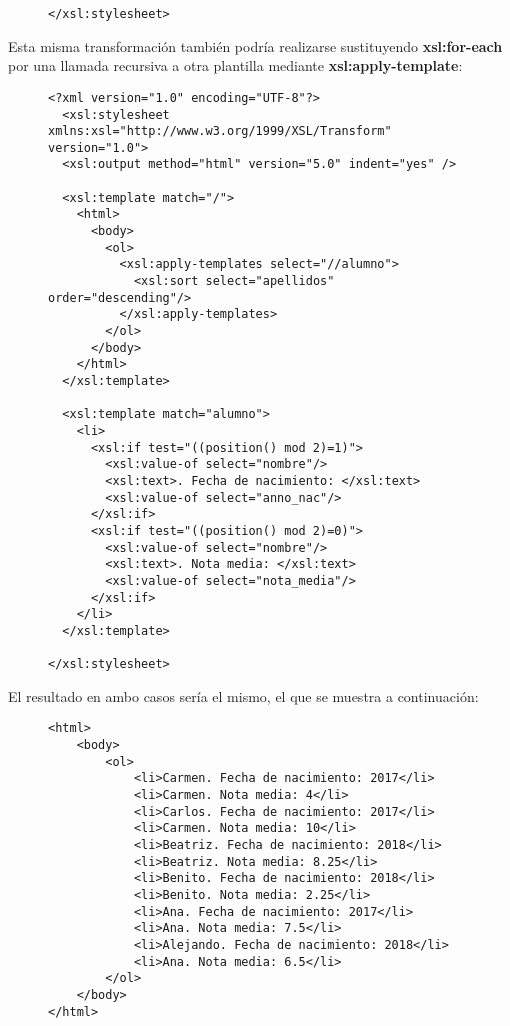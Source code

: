 \begin{itemize}
\begin{figure}[H]
\begin{tcolorbox}[sharp corners, colback=yellow!30, colframe=white!20]
\begin{verbatim}
</xsl:stylesheet>
\end{verbatim}
        \end{tcolorbox}
    \end{figure}

    Esta misma transformación también podría realizarse  sustituyendo \textbf{xsl:for-each} por una llamada recursiva a otra plantilla mediante \textbf{xsl:apply-template}:

    \begin{figure}[H]
        \begin{tcolorbox}[sharp corners, colback=yellow!30, colframe=white!20]
            \tiny
\begin{verbatim}
<?xml version="1.0" encoding="UTF-8"?>
  <xsl:stylesheet xmlns:xsl="http://www.w3.org/1999/XSL/Transform" version="1.0">
  <xsl:output method="html" version="5.0" indent="yes" />

  <xsl:template match="/">
    <html>
      <body>
        <ol>
          <xsl:apply-templates select="//alumno">
            <xsl:sort select="apellidos" order="descending"/>
          </xsl:apply-templates>
        </ol>
      </body>
    </html>
  </xsl:template>

  <xsl:template match="alumno">
    <li>
      <xsl:if test="((position() mod 2)=1)">
        <xsl:value-of select="nombre"/>
        <xsl:text>. Fecha de nacimiento: </xsl:text>
        <xsl:value-of select="anno_nac"/>
      </xsl:if>
      <xsl:if test="((position() mod 2)=0)">
        <xsl:value-of select="nombre"/>
        <xsl:text>. Nota media: </xsl:text>
        <xsl:value-of select="nota_media"/>
      </xsl:if>
    </li>
  </xsl:template>

</xsl:stylesheet>
\end{verbatim}
        \end{tcolorbox}
    \end{figure}

    El resultado en ambo casos sería el mismo, el que se muestra a continuación:

    \begin{figure}[H]
        \begin{tcolorbox}[sharp corners, colback=yellow!30, colframe=white!20]
            \scriptsize
\begin{verbatim}
<html>
    <body>
        <ol>
            <li>Carmen. Fecha de nacimiento: 2017</li>
            <li>Carmen. Nota media: 4</li>
            <li>Carlos. Fecha de nacimiento: 2017</li>
            <li>Carmen. Nota media: 10</li>
            <li>Beatriz. Fecha de nacimiento: 2018</li>
            <li>Beatriz. Nota media: 8.25</li>
            <li>Benito. Fecha de nacimiento: 2018</li>
            <li>Benito. Nota media: 2.25</li>
            <li>Ana. Fecha de nacimiento: 2017</li>
            <li>Ana. Nota media: 7.5</li>
            <li>Alejando. Fecha de nacimiento: 2018</li>
            <li>Ana. Nota media: 6.5</li>
        </ol>
    </body>
</html>
\end{verbatim}
        \end{tcolorbox}
    \end{figure}


\end{itemize}
